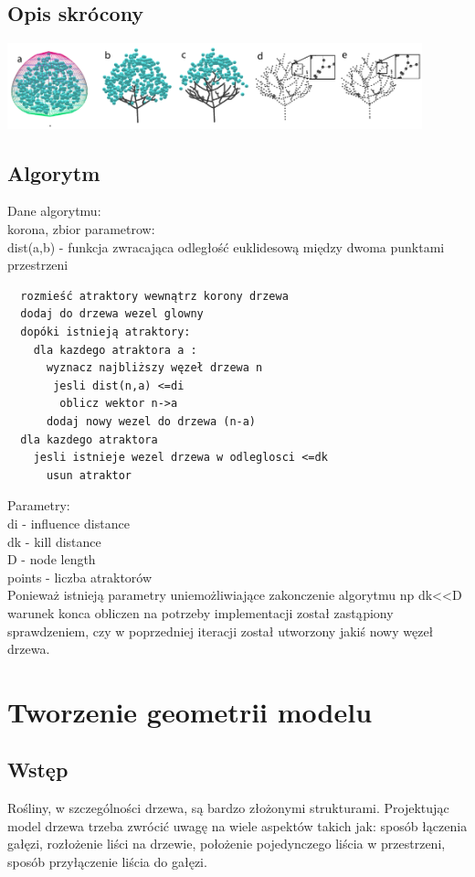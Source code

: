 \subsection{Opis skrócony}
\begin{center}
	\includegraphics[width=120mm]{images/colonization/colonization.png}
	\label{two_segments}
\end{center}


\subsection{Algorytm}
Dane algorytmu: \\
korona, zbior parametrow: \\
dist(a,b) - funkcja zwracająca odległość euklidesową między dwoma punktami przestrzeni  \\
\begin{verbatim}
  rozmieść atraktory wewnątrz korony drzewa
  dodaj do drzewa wezel glowny
  dopóki istnieją atraktory:
    dla kazdego atraktora a :
      wyznacz najbliższy węzeł drzewa n
       jesli dist(n,a) <=di
        oblicz wektor n->a
      dodaj nowy wezel do drzewa (n-a)
  dla kazdego atraktora
    jesli istnieje wezel drzewa w odleglosci <=dk
      usun atraktor
\end{verbatim}
Parametry: \\
di - influence distance\\
dk - kill distance\\
D - node length\\
points - liczba atraktorów\\

Ponieważ istnieją parametry uniemożliwiające zakonczenie algorytmu np dk<<D warunek konca obliczen na potrzeby implementacji został zastąpiony sprawdzeniem, czy w poprzedniej iteracji został utworzony jakiś nowy węzeł drzewa.
\section{Tworzenie geometrii modelu}
\subsection{Wstęp}
Rośliny, w szczególności drzewa, są bardzo złożonymi strukturami. Projektując model drzewa trzeba zwrócić uwagę na wiele aspektów takich jak: sposób łączenia gałęzi, rozłożenie liści na drzewie, położenie pojedynczego liścia w przestrzeni, sposób przyłączenie liścia do gałęzi.


